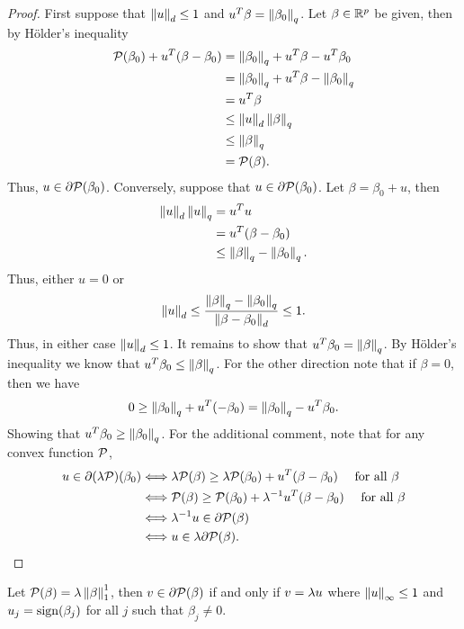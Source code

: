 \begin{proof}
    First suppose that $\left\|u\right\|_d \le 1$ and $u^T\beta = \left\|\beta_0\right\|_q$. Let $\beta \in {\mathbb R}^p$ be given, then by H\"older's inequality
    \begin{align*}
        {\mathcal{P}}(\beta_0)+u^T(\beta-\beta_0) &= \left\|\beta_0\right\|_q + u^T\beta - u^T\beta_0 \\
        &=\left\|\beta_0\right\|_q +u^T\beta - \left\|\beta_0\right\|_q\\
        &=u^T\beta \\
        &\le \left\|u\right\|_d\left\|\beta\right\|_q\\
        &\le \left\|\beta\right\|_q\\
        &={\mathcal{P}}(\beta).
    \end{align*}
    Thus, $u \in \partial {\mathcal{P}}(\beta_0)$. Conversely, suppose that $u \in \partial {\mathcal{P}}(\beta_0)$. Let $\beta = \beta_0+u$, then 
    \begin{align*}
        \left\|u\right\|_d\left\|u\right\|_q &= u^Tu\\
        &=u^T(\beta-\beta_0)\\
        &\le \left\|\beta\right\|_q-\left\|\beta_0\right\|_q.
    \end{align*}
    Thus, either $u = 0$ or 
    \[\left\|u\right\|_d \le \frac{\left\|\beta\right\|_q-\left\|\beta_0\right\|_q}{\left\|\beta-\beta_0\right\|_d}\le 1. \]
    Thus, in either case $\left\|u\right\|_d \le1$. It remains to show that $u^T\beta_0 = \left\|\beta\right\|_q$. By H\"older's inequality we know that $u^T\beta_0 \le \left\|\beta\right\|_q$. For the other direction note that if $\beta = 0$, then we have
    \[0 \ge \left\|\beta_0\right\|_q + u^T(-\beta_0)=\left\|\beta_0\right\|_q-u^T\beta_0. \]
    Showing that $u^T\beta_0 \ge \left\|\beta_0\right\|_q$. For the additional comment, note that for any convex function ${\mathcal{P}}$,
    \begin{align*}
        u \in \partial(\lambda {\mathcal{P}})(\beta_0) &\Longleftrightarrow \lambda{\mathcal{P}}(\beta) \ge \lambda{\mathcal{P}}(\beta_0)+u^T(\beta-\beta_0) ~~~ \text{ for all } \beta\\
        &\Longleftrightarrow {\mathcal{P}}(\beta) \ge {\mathcal{P}}(\beta_0)+\lambda^{-1}u^T(\beta-\beta_0) ~~~ \text{ for all } \beta\\
        &\Longleftrightarrow \lambda^{-1}u \in \partial{\mathcal{P}}(\beta)\\
        &\Longleftrightarrow u \in \lambda\partial {\mathcal{P}}(\beta).\qedhere 
    \end{align*}
\end{proof}
\begin{corollary}
    Let ${\mathcal{P}}(\beta)=\lambda \left\|\beta\right\|_1^1$, then $v \in \partial {\mathcal{P}}(\beta)$ if and only if $v = \lambda u$ where $\left\|u\right\|_\infty \le 1$ and $u_j = \operatorname{sign}(\beta_j)$ for all $j$ such that $\beta_j \neq 0$.
\end{corollary}
